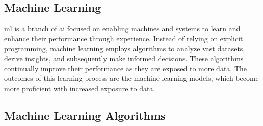 \subsection{Machine Learning}
\gls{ml} is a branch of \gls{ai} focused on enabling machines and systems to learn and enhance their performance through experience. 
Instead of relying on explicit programming, machine learning employs algorithms to analyze vast datasets, derive insights, and subsequently make informed decisions. 
These algorithms continually improve their performance as they are exposed to more data. The outcomes of this learning process are the machine learning models, which become more proficient with increased exposure to data.

\subsection{Machine Learning Algorithms}
